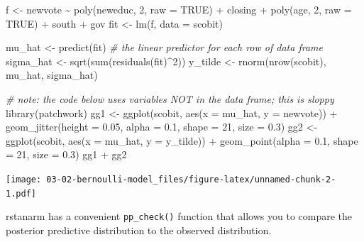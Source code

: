 \documentclass[
]{book}
\newenvironment{Shaded}{\begin{snugshade}}{\end{snugshade}}
\newcommand{\AttributeTok}[1]{\textcolor[rgb]{0.77,0.63,0.00}{#1}}
\newcommand{\CommentTok}[1]{\textcolor[rgb]{0.56,0.35,0.01}{\textit{#1}}}
\newcommand{\ConstantTok}[1]{\textcolor[rgb]{0.00,0.00,0.00}{#1}}
\newcommand{\DecValTok}[1]{\textcolor[rgb]{0.00,0.00,0.81}{#1}}
\newcommand{\FloatTok}[1]{\textcolor[rgb]{0.00,0.00,0.81}{#1}}
\newcommand{\FunctionTok}[1]{\textcolor[rgb]{0.00,0.00,0.00}{#1}}
\newcommand{\NormalTok}[1]{#1}
\newcommand{\OtherTok}[1]{\textcolor[rgb]{0.56,0.35,0.01}{#1}}
\newcommand{\SpecialCharTok}[1]{\textcolor[rgb]{0.00,0.00,0.00}{#1}}
\begin{document}
\begin{Shaded}
\begin{Highlighting}[]
\NormalTok{f }\OtherTok{\textless{}{-}}\NormalTok{ newvote }\SpecialCharTok{\textasciitilde{}} \FunctionTok{poly}\NormalTok{(neweduc, }\DecValTok{2}\NormalTok{, }\AttributeTok{raw =} \ConstantTok{TRUE}\NormalTok{) }\SpecialCharTok{+}\NormalTok{ closing }\SpecialCharTok{+} \FunctionTok{poly}\NormalTok{(age, }\DecValTok{2}\NormalTok{, }\AttributeTok{raw =} \ConstantTok{TRUE}\NormalTok{) }\SpecialCharTok{+}\NormalTok{ south }\SpecialCharTok{+}\NormalTok{ gov}
\NormalTok{fit }\OtherTok{\textless{}{-}} \FunctionTok{lm}\NormalTok{(f, }\AttributeTok{data =}\NormalTok{ scobit)}

\NormalTok{mu\_hat }\OtherTok{\textless{}{-}} \FunctionTok{predict}\NormalTok{(fit)  }\CommentTok{\# the linear predictor for each row of data frame}
\NormalTok{sigma\_hat }\OtherTok{\textless{}{-}} \FunctionTok{sqrt}\NormalTok{(}\FunctionTok{sum}\NormalTok{(}\FunctionTok{residuals}\NormalTok{(fit)}\SpecialCharTok{\^{}}\DecValTok{2}\NormalTok{))}
\NormalTok{y\_tilde }\OtherTok{\textless{}{-}} \FunctionTok{rnorm}\NormalTok{(}\FunctionTok{nrow}\NormalTok{(scobit), mu\_hat, sigma\_hat)}

\CommentTok{\# note: the code below uses variables NOT in the data frame; this is sloppy}
\FunctionTok{library}\NormalTok{(patchwork)}
\NormalTok{gg1 }\OtherTok{\textless{}{-}} \FunctionTok{ggplot}\NormalTok{(scobit, }\FunctionTok{aes}\NormalTok{(}\AttributeTok{x =}\NormalTok{ mu\_hat, }\AttributeTok{y =}\NormalTok{ newvote)) }\SpecialCharTok{+} 
  \FunctionTok{geom\_jitter}\NormalTok{(}\AttributeTok{height =} \FloatTok{0.05}\NormalTok{, }\AttributeTok{alpha =} \FloatTok{0.1}\NormalTok{, }\AttributeTok{shape =} \DecValTok{21}\NormalTok{, }\AttributeTok{size =} \FloatTok{0.3}\NormalTok{)}
\NormalTok{gg2 }\OtherTok{\textless{}{-}} \FunctionTok{ggplot}\NormalTok{(scobit, }\FunctionTok{aes}\NormalTok{(}\AttributeTok{x =}\NormalTok{ mu\_hat, }\AttributeTok{y =}\NormalTok{ y\_tilde)) }\SpecialCharTok{+} 
  \FunctionTok{geom\_point}\NormalTok{(}\AttributeTok{alpha =} \FloatTok{0.1}\NormalTok{, }\AttributeTok{shape =} \DecValTok{21}\NormalTok{, }\AttributeTok{size =} \FloatTok{0.3}\NormalTok{)}
\NormalTok{gg1 }\SpecialCharTok{+}\NormalTok{ gg2}
\end{Highlighting}
\end{Shaded}

\texttt{[image: 03-02-bernoulli-model\_files/figure-latex/unnamed-chunk-2-1.pdf]}

rstanarm has a convenient \texttt{pp\_check()} function that allows you to compare the posterior predictive distribution to the observed distribution.
\end{document}
